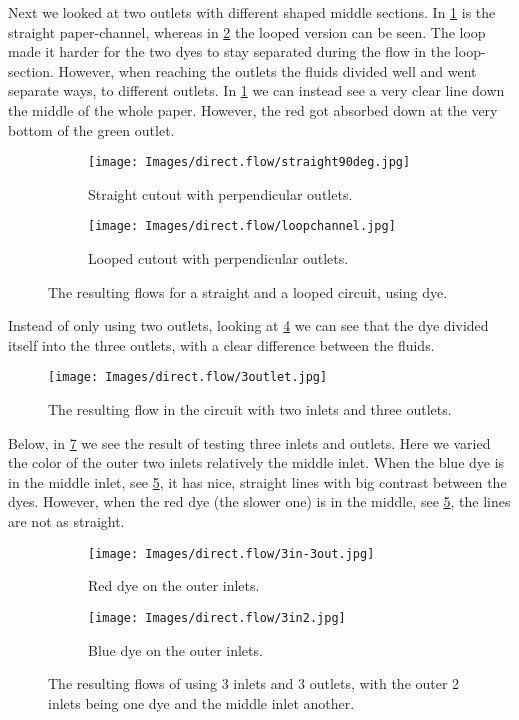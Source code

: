  Next we looked at two outlets with different shaped middle sections. In \ref{fig:sub:straight} is the straight paper-channel, whereas in \ref{fig:sub:loop} the looped version can be seen. The loop made it harder for the two dyes to stay separated during the flow in the loop-section. However, when reaching the outlets the fluids divided well and went separate ways, to different outlets. In \ref{fig:sub:straight} we can instead see a very clear line down the middle of the whole paper. However, the red got absorbed down at the very bottom of the green outlet.
\begin{figure}[H]
\centering
\begin{subfigure}[b]{\subSizeO\textwidth}
  \centering
  \texttt{[image: Images/direct.flow/straight90deg.jpg]}
  \caption{Straight cutout with perpendicular outlets.}
  \label{fig:sub:straight}
\end{subfigure}%
\begin{subfigure}[b]{\subSizeO \textwidth}
  \centering
  \texttt{[image: Images/direct.flow/loopchannel.jpg]}
  \caption{Looped cutout with perpendicular outlets.}
  \label{fig:sub:loop}
\end{subfigure}
\caption{The resulting flows for a straight and a looped circuit, using dye.}
\label{fig:straightloop}
\end{figure} 

Instead of only using two outlets, looking at \ref{fig:3out} we can see that the dye divided itself into the three outlets, with a clear difference between the fluids.
\begin{figure}[H]
    \centering
    \texttt{[image: Images/direct.flow/3outlet.jpg]}
    \caption{The resulting flow in the circuit with two inlets and three outlets.}
    \label{fig:3out}
\end{figure}


Below, in \ref{fig:3in} we see the result of testing three inlets and outlets. Here we varied the color of the outer two inlets relatively the middle inlet. When the blue dye is in the middle inlet, see \ref{fig:sub:3in1}, it has nice, straight lines with big contrast between the dyes. However, when the red dye (the slower one) is in the middle, see \ref{fig:sub:3in1}, the lines are not as straight. 
\begin{figure}[H]
\centering
\begin{subfigure}[b]{\subSizeO\textwidth}
  \centering
  \texttt{[image: Images/direct.flow/3in-3out.jpg]}
  \caption{Red dye on the outer inlets.}
  \label{fig:sub:3in1}
\end{subfigure}%
\begin{subfigure}[b]{\subSizeO \textwidth}
  \centering
  \texttt{[image: Images/direct.flow/3in2.jpg]}
  \caption{Blue dye on the outer inlets.}
  \label{fig:sub:3in2}
\end{subfigure}
\caption{The resulting flows of using 3 inlets and 3 outlets, with the outer 2 inlets being one dye and the middle inlet another.}
\label{fig:3in}
\end{figure}

